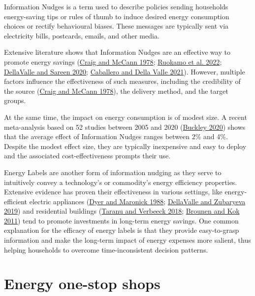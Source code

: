 \documentclass[
  12pt,
  captions=heading]{scrreport}
\begin{document}
Information Nudges is a term used to describe policies sending
households energy-saving tips or rules of thumb to induce desired energy
consumption choices or rectify behavioural biases. These messages are
typically sent via electricity bills, postcards, emails, and other
media.

Extensive literature shows that Information Nudges are an effective way
to promote energy savings
(\protect\hyperlink{ref-craig1978assessing}{Craig and McCann 1978};
\protect\hyperlink{ref-ruokamo2022effect}{Ruokamo et al. 2022};
\protect\hyperlink{ref-dellavalle2020nudging}{DellaValle and Sareen
2020}; \protect\hyperlink{ref-caballero2021tackling}{Caballero and Della
Valle 2021}). However, multiple factors influence the effectiveness of
such measures, including the credibility of the source
(\protect\hyperlink{ref-craig1978assessing}{Craig and McCann 1978}), the
delivery method, and the target groups.

At the same time, the impact on energy consumption is of modest size. A
recent meta-analysis based on 52 studies between 2005 and 2020
(\protect\hyperlink{ref-buckley2020prices}{Buckley 2020}) shows that the
average effect of Information Nudges ranges between 2\% and 4\%. Despite
the modest effect size, they are typically inexpensive and easy to
deploy and the associated cost-effectiveness prompts their use.

Energy Labels are another form of information nudging as they serve to
intuitively convey a technology's or commodity's energy efficiency
properties. Extensive evidence has proven their effectiveness in various
settings, like energy-efficient electric appliances
(\protect\hyperlink{ref-dyer1988evaluation}{Dyer and Maronick 1988};
\protect\hyperlink{ref-dellavalle2019can}{DellaValle and Zubaryeva
2019}) and residential buildings
(\protect\hyperlink{ref-taranu2018closer}{Taranu and Verbeeck 2018};
\protect\hyperlink{ref-brounen2011economics}{Brounen and Kok 2011}) tend
to promote investments in long-term energy savings. One common
explanation for the efficacy of energy labels is that they provide
easy-to-grasp information and make the long-term impact of energy
expenses more salient, thus helping households to overcome
time-inconsistent decision patterns.

\hypertarget{energy-one-stop-shops}{%
\section{Energy one-stop shops}\label{energy-one-stop-shops}}
\end{document}
